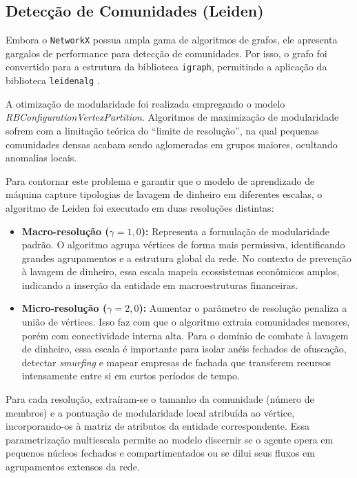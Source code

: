 \documentclass[titlepage,a4paper,oneside,onecolumn,12pt]{report}
\begin{document}
\subsection{Detecção de Comunidades (Leiden)}

Embora o \texttt{NetworkX} possua ampla gama de algoritmos de grafos, ele apresenta gargalos de performance para detecção de comunidades. Por isso, o grafo foi convertido para a estrutura da biblioteca \texttt{igraph}, permitindo a aplicação da biblioteca \texttt{leidenalg} \cite{traag2019leiden}.

A otimização de modularidade foi realizada empregando o modelo \textit{RBConfigurationVertexPartition}. Algoritmos de maximização de modularidade sofrem com a limitação teórica do ``limite de resolução'', na qual pequenas comunidades densas acabam sendo aglomeradas em grupos maiores, ocultando anomalias locais.

Para contornar este problema e garantir que o modelo de aprendizado de máquina capture tipologias de lavagem de dinheiro em diferentes escalas, o algoritmo de Leiden foi executado em duas resoluções distintas:

\begin{itemize}
    \item \textbf{Macro-resolução ($\gamma = 1{,}0$):} Representa a formulação de modularidade padrão. O algoritmo agrupa vértices de forma mais permissiva, identificando grandes agrupamentos e a estrutura global da rede. No contexto de prevenção à lavagem de dinheiro, essa escala mapeia ecossistemas econômicos amplos, indicando a inserção da entidade em macroestruturas financeiras.
    
    \item \textbf{Micro-resolução ($\gamma = 2{,}0$):} Aumentar o parâmetro de resolução penaliza a união de vértices. Isso faz com que o algoritmo extraia comunidades menores, porém com conectividade interna alta. Para o domínio de combate à lavagem de dinheiro, essa escala é importante para isolar anéis fechados de ofuscação, detectar \textit{smurfing} e mapear empresas de fachada que transferem recursos intensamente entre si em curtos períodos de tempo.
\end{itemize}

Para cada resolução, extraíram-se o tamanho da comunidade (número de membros) e a pontuação de modularidade local atribuída ao vértice, incorporando-os à matriz de atributos da entidade correspondente. Essa parametrização multiescala permite ao modelo discernir se o agente opera em pequenos núcleos fechados e compartimentados ou se dilui seus fluxos em agrupamentos extensos da rede.
\end{document}

